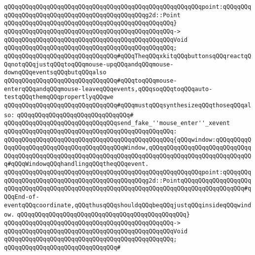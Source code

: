 \verb|qQQqqQQqqQQqqQQqqQQqqQQqqQQqqQQqqQQqqQQqqQQqqQQqqQQqqQQqpoint:qQQqqQQqqQQqqQQqqQQqqQQqqQQqqQQqqQQqqQQqqQQqqQQqg2d::Point|\newline
\verb|qQQqqQQqqQQqqQQqqQQqqQQqqQQqqQQqqQQqqQQqqQQqqQQq}|\newline
\verb|qQQqqQQqqQQqqQQqqQQqqQQqqQQqqQQqqQQqqQQqqQQqqQQq->|\newline
\verb|qQQqqQQqqQQqqQQqqQQqqQQqqQQqqQQqqQQqqQQqqQQqqQQqVoid|\newline
\verb|qQQqqQQqqQQqqQQqqQQqqQQqqQQqqQQqqQQqqQQqqQQqqQQq;|\newline
\newline
\verb|qQQqqQQqqQQqqQQqqQQqqQQqqQQqqQQq#qQQqTheqQQqxkitqQQqbuttonsqQQqreactqQQqnotqQQqjustqQQqtoqQQqmouse-upqQQqandqQQqmouse-downqQQqeventsqQQqbutqQQqalso|\newline
\verb|qQQqqQQqqQQqqQQqqQQqqQQqqQQqqQQq#qQQqtoqQQqmouse-enterqQQqandqQQqmouse-leaveqQQqevents,qQQqsoqQQqtoqQQqauto-testqQQqthemqQQqpropertlyqQQqwe|\newline
\verb|qQQqqQQqqQQqqQQqqQQqqQQqqQQqqQQq#qQQqmustqQQqsynthesizeqQQqthoseqQQqalso:|\newline
\verb|qQQqqQQqqQQqqQQqqQQqqQQqqQQqqQQq#|\newline
\verb|qQQqqQQqqQQqqQQqqQQqqQQqqQQqqQQqsend_fake_''mouse_enter''_xevent|\newline
\verb|qQQqqQQqqQQqqQQqqQQqqQQqqQQqqQQqqQQqqQQqqQQqqQQq:|\newline
\verb|qQQqqQQqqQQqqQQqqQQqqQQqqQQqqQQqqQQqqQQqqQQqqQQq{qQQqwindow:qQQqqQQqqQQqqQQqqQQqqQQqqQQqqQQqqQQqqQQqqQQqWindow,qQQqqQQqqQQqqQQqqQQqqQQqqQQqqQQqqQQqqQQqqQQqqQQqqQQqqQQqqQQqqQQqqQQqqQQqqQQqqQQqqQQqqQQqqQQqqQQqqQQq#qQQqWindowqQQqhandlingqQQqtheqQQqevent.|\newline
\verb|qQQqqQQqqQQqqQQqqQQqqQQqqQQqqQQqqQQqqQQqqQQqqQQqqQQqqQQqpoint:qQQqqQQqqQQqqQQqqQQqqQQqqQQqqQQqqQQqqQQqqQQqqQQqg2d::PointqQQqqQQqqQQqqQQqqQQqqQQqqQQqqQQqqQQqqQQqqQQqqQQqqQQqqQQqqQQqqQQqqQQqqQQqqQQqqQQqqQQqqQQq#qQQqEnd-of-eventqQQqcoordinate,qQQqthusqQQqshouldqQQqbeqQQqjustqQQqinsideqQQqwindow.|\newline
\verb|qQQqqQQqqQQqqQQqqQQqqQQqqQQqqQQqqQQqqQQqqQQqqQQq}|\newline
\verb|qQQqqQQqqQQqqQQqqQQqqQQqqQQqqQQqqQQqqQQqqQQqqQQq->|\newline
\verb|qQQqqQQqqQQqqQQqqQQqqQQqqQQqqQQqqQQqqQQqqQQqqQQqVoid|\newline
\verb|qQQqqQQqqQQqqQQqqQQqqQQqqQQqqQQqqQQqqQQqqQQqqQQq;|\newline
\verb|qQQqqQQqqQQqqQQqqQQqqQQqqQQqqQQq#|\newline
